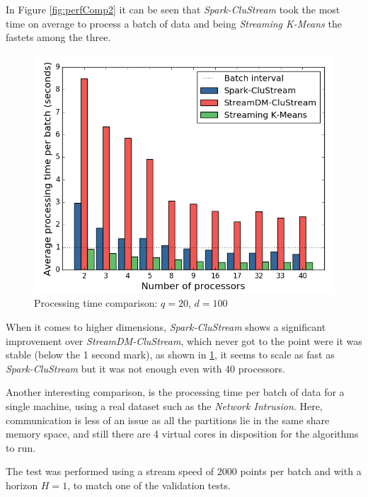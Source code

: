 In Figure \ref{fig:perfComp2} it can be seen that \textit{Spark-CluStream} took the most time on average to process a batch of data and being \textit{Streaming K-Means} the fastets among the three. 

\begin{figure}[h!]
 \centering
 \includegraphics[scale=0.45]{./styles/perfComp100.png}
 \caption{Processing time comparison: $q=20$, $d=100$}
 \label{fig:perfComp100}
\end{figure}

When it comes to higher dimensions, \textit{Spark-CluStream} shows a significant improvement over \textit{StreamDM-CluStream}, which never got to the point were it was stable (below the 1 second mark), as shown in \ref{fig:perfComp100}, it seems to scale as fast as \textit{Spark-CluStream} but it was not enough even with 40 processors. 


Another interesting comparison, is the processing time per batch of data for a single machine, using a real dataset such as the \textit{Network Intrusion}. Here, communication is less of an issue as all the partitions lie in the same share memory space, and still there are 4 virtual cores in disposition for the algorithms to run. 

The test was performed using a stream speed of 2000 points per batch and with a horizon $H=1$, to match one of the validation tests.

